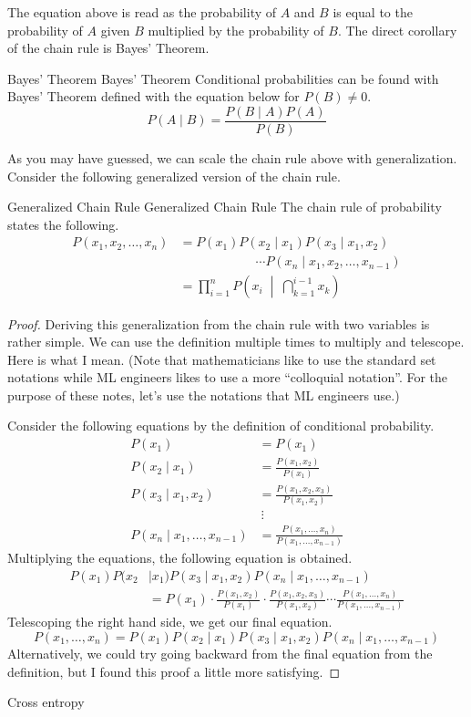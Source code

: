 \documentclass[../main.tex]{subfiles}
\begin{document}
The equation above is read as the probability of $A$ and $B$
is equal to the probability of $A$ given $B$ multiplied by
the probability of $B$. The direct corollary of the chain rule
is Bayes' Theorem.

\begin{theorem}
{Bayes' Theorem}
{Bayes' Theorem}
Conditional probabilities can be found with Bayes' Theorem
defined with the equation below for $P(B) \neq 0$.
\[
P(A \mid B) = \frac{P(B \mid A) P(A)}{P(B)}
\]
\end{theorem}

As you may have guessed, we can scale the chain rule above
with generalization. Consider the following generalized version
of the chain rule.

\begin{theorem}
{Generalized Chain Rule}
{Generalized Chain Rule}
The chain rule of probability states the following.
\begin{align*}
    P(x_1, x_2, \ldots, x_n)
    &= P(x_1) P(x_2 \mid x_1) P(x_3 \mid x_1, x_2) \\
        &\qquad\qquad\qquad\cdots
            P(x_n \mid x_1, x_2, \ldots, x_{n-1}) \\
    &= \prod_{i = 1}^{n} P \left(
        x_i \; \middle|\; \bigcap_{k = 1}^{i - 1} x_{k}
    \right)
\end{align*}
\end{theorem}
\begin{proof}
Deriving this generalization from the chain rule with two
variables is rather simple. We can use the definition multiple
times to multiply and telescope. Here is what I mean. (Note
that mathematicians like to use the standard set notations while
ML engineers likes to use a more ``colloquial notation''. For
the purpose of these notes, let's use the notations that ML
engineers use.)

Consider the following equations by the definition of conditional
probability.
\begin{align*}
    P(x_1) &= P(x_1) \\
    P(x_2 \mid x_1) &= \frac{P(x_1, x_2)}{P(x_1)} \\
    P(x_3 \mid x_1, x_2) &= \frac{P(x_1, x_2, x_3)}{P(x_1, x_2)} \\
    &\ \vdots \\
    P(x_n \mid x_1, \ldots, x_{n-1})
        &= \frac{P(x_1, \ldots, x_n)}{P(x_1, \ldots, x_{n-1})}
\end{align*}
Multiplying the equations, the following equation is obtained.
\begin{align*}
    P(x_1) P(x_2 &\mid x_1) P(x_3 \mid x_1, x_2)
        P(x_n \mid x_1, \ldots, x_{n-1}) \\
    &= P(x_1) \cdot \frac{P(x_1, x_2)}{P(x_1)} \cdot
        \frac{P(x_1, x_2, x_3)}{P(x_1, x_2)} \cdots
        \frac{P(x_1, \ldots, x_n)}{P(x_1, \ldots, x_{n-1})}
\end{align*}
Telescoping the right hand side, we get our final equation.
\[
P(x_1, \ldots, x_n)
= P(x_1) P(x_2 \mid x_1) P(x_3 \mid x_1, x_2)
    P(x_n \mid x_1, \ldots, x_{n-1})
\]
Alternatively, we could try going backward from the final
equation from the definition, but I found this proof a little
more satisfying.
\end{proof}





Cross entropy
\end{document}
